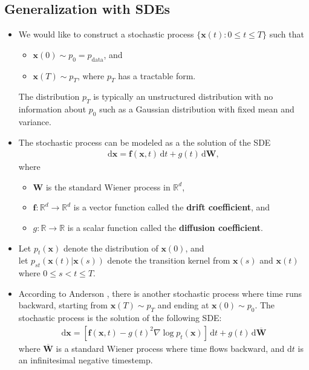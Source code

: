 \documentclass[10pt]{article}
\newcommand{\dee}{\mathrm{d}}
\newcommand{\ve}[1]{\mathbf{#1}}
\newcommand{\mrm}[1]{\mathrm{#1}}
\newcommand{\Real}{\mathbb{R}}
\begin{document}
\subsection{Generalization with SDEs}

\begin{itemize}
  \item We would like to construct a stochastic process $\{ \ve{x}(t): 0 \leq t \leq T \}$ such that
  \begin{itemize}
    \item $\ve{x}(0) \sim p_0 = p_{\mrm{data}}$, and
    \item $\ve{x}(T) \sim p_T$, where $p_T$ has a tractable form.
  \end{itemize}
  The distribution $p_T$ is typically an unstructured distribution with no information about $p_0$ such as a Gaussian distribution with fixed mean and variance.

  \item The stochastic process can be modeled as a the solution of the SDE
  \begin{align*}
    \dee \ve{x} = \ve{f}(\ve{x},t)\, \dee t + g(t)\, \dee\ve{W},
  \end{align*}
  where
  \begin{itemize}
    \item $\ve{W}$ is the standard Wiener process in $\Real^d$,
    \item $\ve{f}: \Real^d \rightarrow \Real^d$ is a vector function called the {\bf drift coefficient}, and
    \item $g: \Real \rightarrow \Real$ is a scalar function called the {\bf diffusion coefficient}.
  \end{itemize}

  \item Let $p_t(\ve{x})$ denote the distribution of $\ve{x}(0)$, and\\ let $p_{st}(\ve{x}(t)|\ve{x}(s))$ denote the transition kernel from $\ve{x}(s)$ and $\ve{x}(t)$ where $0 \leq s < t \leq T$.
  
  \item According to Anderson \cite{Anderson:1982}, there is another stochastic process where time runs backward, starting from $\ve{x}(T) \sim p_T$ and ending at $\ve{x}(0) \sim p_0$. The stochastic process is the solution of the following SDE:
  \begin{align*}
    \dee \ve{x} = [\ve{f}(\ve{x},t) - g(t)^2 \nabla \log p_t(\ve{x})]\, \dee t + g(t)\, \dee\overline{\ve{W}}
  \end{align*}
  where $\overline{\ve{W}}$ is a standard Wiener process where time flows backward, and $\dee t$ is an infinitesimal negative timestemp.


\end{itemize}
\end{document}
